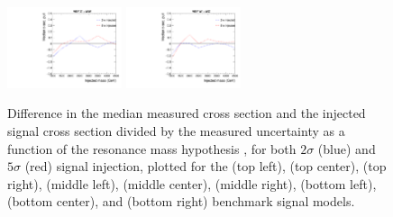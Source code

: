 \begin{figure}[htbp]
  \includegraphics[width=0.3\textwidth]{fig/fitValidation/bias_VBFZprToWW_median.pdf}
  \includegraphics[width=0.3\textwidth]{fig/fitValidation/bias_VBFWprToWZ_median.pdf}\\
  \caption{
    Difference in the median measured cross section and the injected signal cross section divided by the measured uncertainty as a function of the resonance mass hypothesis \MX, for both $2\sigma$ (blue) and $5\sigma$ (red) signal injection, plotted for the \ggF\GBulktoWW (top left), \ggF\RadtoWW (top center), \DY\ZprtoWW (top right), \DY\WprtoWZ (middle left), \DY\WprtoWH (middle center), \VBF\GBulktoWW (middle right), \VBF\RadtoWW (bottom left), \VBF\ZprtoWW (bottom center), and \VBF\WprtoWZ (bottom right) benchmark signal models.
  }
  \label{fig:biasTest_injectedSignal}
\end{figure}
